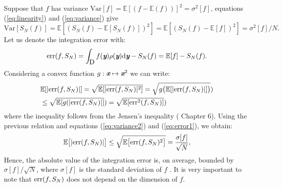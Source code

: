 Suppose that $f$ has variance $\textrm{Var}[f]=\mathbb{E}[(f-\mathbb{E}(f))]^2 = \sigma^2[f] $, equations (\ref{eq:linearity}) and (\ref{eq:variance}) give
\begin{equation}\label{eq:variance2}
\textrm{Var}[S_N(f)] = \mathbb{E}[(S_{N}(f)-\mathbb{E}[S_{N}(f)])^2]= \mathbb{E}[(S_{N}(f)-\mathbb{E}[f])^2] = \sigma^2[f]/N.
\end{equation}
Let us denote the integration error with:
\begin{equation}\label{eq:error1}
\textrm{err}(f, S_{N}) =\int_{\mbox{$\textup{D}$}}f(\textit{\textbf{y}})\rho(\textit{\textbf{y}}) \textrm{d}\textit{\textbf{y}}-S_{N}(f) = \mathbb{E}[f]-S_N(f).
\end{equation}
Considering a convex function $g:\textit{\textbf{x}}\mapsto\textit{\textbf{x}}^2$ we can write:
\begin{equation}
\begin{aligned}
&\mathbb{E}[|\textrm{err}(f, S_{N})|] = \sqrt{\mathbb{E}[|\textrm{err}(f, S_{N})|^2]} = \sqrt{g\big(\mathbb{E}[|\textrm{err}(f, S_{N})|]\big)}) \\&\leq\sqrt{\mathbb{E}[g(|\textrm{err}(f, S_{N})|]}) = \sqrt{\mathbb{E}[\textrm{err}^2(f, S_{N})]})
\end{aligned}
\end{equation} 
where the inequality follows from the Jensen's inequality (\cite{williams1991probability} Chapter $6$).
Using the previous relation and equations (\ref{eq:variance2}) and (\ref{eq:error1}), we obtain:
\begin{equation}\label{eq:mean_error}
\mathbb{E}\big[|\textrm{err}(f, S_{N})|\big]\leq
\sqrt{\mathbb{E}\big[\textrm{err}(f, S_{N})^2\big]} = \frac{\sigma[f]}{\sqrt{N}},
\end{equation}
Hence, the absolute value of the integration error is, on average, bounded by $\sigma[f]/\sqrt{N}$, where $\sigma[f]$ is the standard deviation of $f$ \cite{leobacher2014introduction}. It is very important to note that $\textrm{err}(f, S_{N})$ does not depend on the dimension of $f$.
